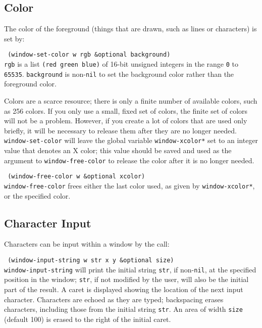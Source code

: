 \subsection{Color}

The color of the foreground (things that are drawn, such as lines or
characters) is set by:

{\tt \hspace*{0.5in} (window-set-color w rgb \&optional background)} \\

{\tt rgb} is a list {\tt (red green blue)} of 16-bit unsigned integers in
the range {\tt 0} to {\tt 65535}.  {\tt background} is non-{\tt nil}
to set the background color rather than the foreground color.

Colors are a scarce resource; there is only a finite number of
available colors, such as 256 colors.  If you only use a small, fixed set
of colors, the finite set of colors will not be a problem.  However,
if you create a lot of colors that are used only briefly, it will be
necessary to release them after they are no longer needed.
{\tt window-set-color} will leave the global variable {\tt *window-xcolor*}
set to an integer value that denotes an X color; this value should be
saved and used as the argument to {\tt window-free-color} to release
the color after it is no longer needed.

{\tt \hspace*{0.5in} (window-free-color w \&optional xcolor)} \\

{\tt window-free-color} frees either the last color used, as given by
{\tt *window-xcolor*}, or the specified color.


\subsection{Character Input}

Characters can be input within a window by the call:

{\tt \hspace*{0.5in} (window-input-string w str x y \&optional size)} \\

{\tt window-input-string} will print the initial string {\tt str},
if non-{\tt nil},
at the specified position in the window; {\tt str}, if not modified
by the user, will also be the initial part of the result.  A caret
is displayed showing the location of the next input character.
Characters are echoed as they are typed; backspacing erases characters,
including those from the initial string {\tt str}.  An area of width
{\tt size} (default 100) is erased to the right of the initial caret.


